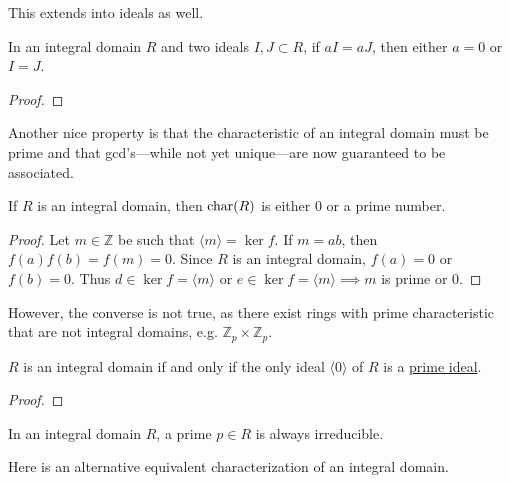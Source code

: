  This extends into ideals as well. 

  \begin{theorem}
    \label{thm:cancellation-property-of-ideals}
    In an integral domain $R$ and two ideals $I, J \subset R$, if $aI = aJ$, then either $a = 0$ or $I = J$. 
  \end{theorem}
  \begin{proof}
    
  \end{proof}

  Another nice property is that the characteristic of an integral domain must be prime and that gcd's---while not yet unique---are now guaranteed to be associated. 

  \begin{corollary}
    \label{thm:characteristic-of-integral-domain}
    If $R$ is an integral domain, then $\operatorname{char}(R)$ is either $0$ or a prime number. 
  \end{corollary}
  \begin{proof}
    Let $m \in \mathbb{Z}$ be such that $\langle m \rangle = \ker{f}$. If $m = ab$, then $f(a) f(b) = f(m) = 0$. Since $R$ is an integral domain, $f(a) = 0$ or $f(b) = 0$. Thus $d \in \ker{f} = \langle m \rangle$ or $e \in \ker{f} = \langle m \rangle \implies m$ is prime or $0$. 
  \end{proof}

  However, the converse is not true, as there exist rings with prime characteristic that are not integral domains, e.g. $\mathbb{Z}_p \times \mathbb{Z}_p$. 

  \begin{theorem}
    \label{thm:ideals-of-an-integral-domain}
    $R$ is an integral domain if and only if the only ideal $\langle 0 \rangle$ of $R$ is a \hyperref[def:prime-ideal]{prime ideal}. 
  \end{theorem}
  \begin{proof}
    
  \end{proof}

  \begin{theorem}
    \label{thm:primes-are-irreducible}
    In an integral domain $R$, a prime $p \in R$ is always irreducible. 
  \end{theorem}

  Here is an alternative equivalent characterization of an integral domain. 

